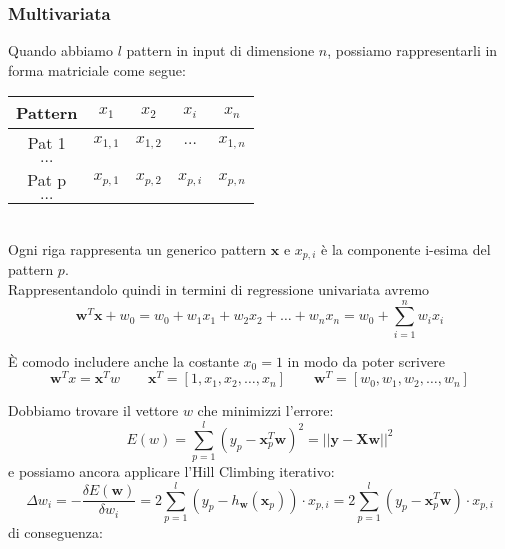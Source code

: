 \subsubsection{Multivariata}
Quando abbiamo $l$ pattern in input di dimensione $n$, possiamo rappresentarli in forma matriciale come segue:
\begin{table}[!h]
	\centering
	\begin{tabular}{|c|c|c|c|c|}
		\hline
		\textbf{Pattern} & $x_1$ & $x_2$ & $x_i$ & $x_n$ \\
		\hline
		Pat 1 & $x_{1,1}$ & $x_{1,2}$ & $\ldots$ & $x_{1,n}$ \\
		\hline
		$\ldots$ & & & & \\
		\hline
		Pat p & $x_{p,1}$ & $x_{p,2}$ & $x_{p,i}$ & $x_{p,n}$ \\
		\hline
		$\ldots$ & & & & \\
		\hline
	\end{tabular}
\end{table}
\\ Ogni riga rappresenta un generico pattern $\mathbf{x}$ e $x_{p,i}$ è la componente i-esima del pattern $p$.\\
Rappresentandolo quindi in termini di regressione univariata avremo
\begin{equation}
	\mathbf{w}^T\mathbf{x} + w_0 = w_0 + w_1x_1 + w_2x_2 + \ldots  + w_nx_n = w_0 + \sum_{i=1}^{n} w_i x_i
\end{equation}
\begin{note}
	È comodo includere anche la costante $x_0=1$ in modo da poter scrivere
	\begin{equation*}
		\mathbf{w}^Tx = \mathbf{x}^T w \quad\quad \mathbf{x}^T = [1, x_1, x_2, \ldots, x_n] \quad \quad \mathbf{w}^T = [w_0, w_1, w_2, \ldots, w_n]
	\end{equation*}
\end{note}
\noindent Dobbiamo trovare il vettore $w$ che minimizzi l'errore:
\begin{equation}
	E(w)=\sum_{p=1}^{l} (y_p - \mathbf{x}_p^T\mathbf{w})^2 = \lvert\lvert \mathbf{y} - \mathbf{Xw}\rvert\rvert^2
\end{equation} e possiamo ancora applicare l'Hill Climbing iterativo:
\begin{equation}
	\Delta w_i = -\frac{\delta E(\mathbf{w})}{\delta w_i} = 2\sum_{p=1}^{l}(y_p - h_\mathbf{w}(\mathbf{x}_p)) \cdot x_{p,i} = 2\sum_{p=1}^{l}(y_p - \mathbf{x}_p^T \mathbf{w}) \cdot x_{p,i}
\end{equation}
di conseguenza:

